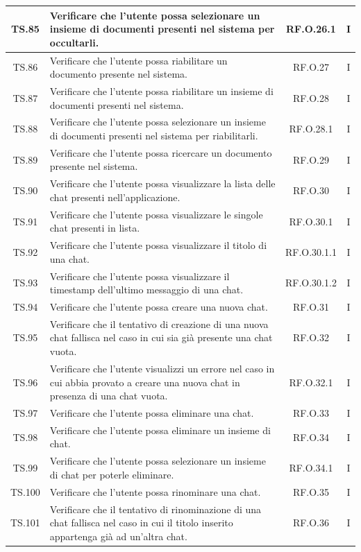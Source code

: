 \documentclass[10pt, a4paper]{article}
\begin{document}
\begin{xltabular}{\textwidth}{|c|X|c|c|}
\hline
TS.85 & Verificare che l'utente possa selezionare un insieme di documenti presenti nel sistema per occultarli. & RF.O.26.1 & I \\
\hline
TS.86 & Verificare che l'utente possa riabilitare un documento presente nel sistema. & RF.O.27 & I \\
\hline
TS.87 & Verificare che l'utente possa riabilitare un insieme di documenti presenti nel sistema. & RF.O.28 & I \\
\hline
TS.88 & Verificare che l'utente possa selezionare un insieme di documenti presenti nel sistema per riabilitarli. & RF.O.28.1 & I \\
\hline
TS.89 & Verificare che l'utente possa ricercare un documento presente nel sistema. & RF.O.29 & I \\
\hline
TS.90 & Verificare che l'utente possa visualizzare la lista delle chat presenti nell’applicazione. & RF.O.30 & I \\
\hline
TS.91 & Verificare che l'utente possa visualizzare le singole chat presenti in lista. & RF.O.30.1 & I \\
\hline
TS.92 & Verificare che l'utente possa visualizzare il titolo di una chat. & RF.O.30.1.1 & I \\
\hline
TS.93 & Verificare che l'utente possa visualizzare il timestamp dell’ultimo messaggio di una chat. & RF.O.30.1.2 & I \\
\hline
TS.94 & Verificare che l'utente possa creare una nuova chat. & RF.O.31 & I \\
\hline
TS.95 & Verificare che il tentativo di creazione di una nuova chat fallisca nel caso in cui sia già presente una chat vuota. & RF.O.32 & I \\
\hline
TS.96 & Verificare che l'utente visualizzi un errore nel caso in cui abbia provato a creare una nuova chat in presenza di una chat vuota. & RF.O.32.1 & I \\
\hline
TS.97 & Verificare che l'utente possa eliminare una chat. & RF.O.33 & I \\
\hline
TS.98 & Verificare che l'utente possa eliminare un insieme di chat. & RF.O.34 & I \\
\hline
TS.99 & Verificare che l'utente possa selezionare un insieme di chat per poterle eliminare. & RF.O.34.1 & I \\
\hline
TS.100 & Verificare che l'utente possa rinominare una chat. & RF.O.35 & I \\
\hline
TS.101 & Verificare che il tentativo di rinominazione di una chat fallisca nel caso in cui il titolo inserito appartenga già ad un’altra chat. & RF.O.36 & I \\

\end{xltabular}
\end{document}
